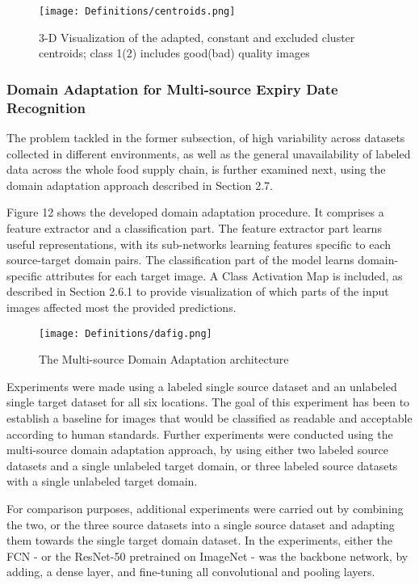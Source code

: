 \documentclass[journal,article,accept,moreauthors,pdftex]{Definitions/mdpi}
\begin{document}
\begin{figure*}[tph!]
\texttt{[image: Definitions/centroids.png]}
\centering
\caption{3-D Visualization of the adapted, constant and excluded cluster centroids; class 1(2) includes good(bad) quality images}
\label{centroids}
\end{figure*}

\subsubsection{Domain Adaptation for Multi-source Expiry Date Recognition}

The problem tackled in the former subsection, of high variability across datasets collected in different environments, as well as the general unavailability of labeled data across the whole food supply chain, is further examined next, using the domain adaptation approach described in Section 2.7.

Figure 12 shows the developed domain adaptation procedure.  It comprises a feature extractor and
a classification part. The feature extractor part learns useful
representations, with its sub-networks
learning features specific to each source-target domain pairs.
The classification part of the model learns domain-specific
attributes for each target image. A Class Activation Map is included, as described in Section 2.6.1 to provide 
visualization of which parts of the input images affected most the provided predictions.

\begin{figure*}[tph!]
\texttt{[image: Definitions/dafig.png]}
\centering
\caption{The Multi-source Domain Adaptation architecture}
\label{Dafig}
\end{figure*}

Experiments were made using a labeled single source
dataset and an unlabeled single target dataset for all six locations. The goal of this experiment has been to establish
a baseline for images that would be classified as readable
and acceptable according to human standards. Further experiments
were conducted using the multi-source
domain adaptation approach, by using either two labeled
source datasets and a single unlabeled target domain, or three
labeled source datasets with a single unlabeled target domain.


For comparison purposes, additional
experiments were carried out by combining the two, or the three
source datasets into a single source dataset and adapting them towards the single target domain dataset. 
In the experiments, either the FCN - or the ResNet-50 \cite{ref43} pretrained on ImageNet \cite{ref44} - was the backbone network, by adding,  a dense layer, and  fine-tuning
all convolutional and pooling layers.
\end{document}

